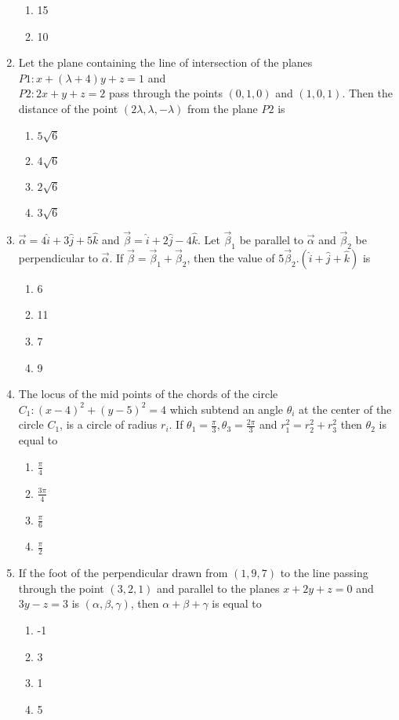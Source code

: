 \documentclass[journal]{IEEEtran}
\begin{document}
\begin{enumerate}
\begin{enumerate}
    \item 15
    \item 10
\end{enumerate}
\item Let the plane containing the line of intersection
of the planes \\
$P1: x + (\lambda + 4)y + z = 1$ and \\
$P2 : 2x + y + z = 2$ pass through the points $(0, 1, 0)$
and $(1, 0, 1)$. Then the distance of the point
$(2\lambda, \lambda, -\lambda)$ from the plane $P2$ is
\begin{enumerate}
    \item $ 5\sqrt{6}$
    \item $ 4\sqrt{6}$
    \item $ 2\sqrt{6}$
    \item $ 3\sqrt{6}$
\end{enumerate}
\item $\overrightarrow{\alpha}=4\hat{i}+3\hat{j}+5\hat{k}$ and $ \overrightarrow{\beta}=\hat{i}+2\hat{j}-4\hat{k}$. Let  $\overrightarrow{\beta}_{1}$ be parallel to $\overrightarrow{\alpha}$ and $\overrightarrow{\beta}_{2}$ be perpendicular to $\overrightarrow{\alpha}$. If $\overrightarrow{\beta}=\overrightarrow{\beta}_{1}+\overrightarrow{\beta}_{2}$, then the value of $5\overrightarrow{\beta}_{2}.(\hat{i}+\hat{j}+\hat{k})$ is
\begin{enumerate}
    \item 6
    \item 11
    \item 7
    \item 9
\end{enumerate}
\item The locus of the mid points of the chords of the
circle $C_{1}:(x-4)^{2}+(y-5)^{2}=4$ which subtend an angle $\theta_{i}$ at the center of the circle $C_{1}$, is a circle of radius $ r_{i}$. If $ \theta_{1}=\frac{\pi}{3},\theta_{3}=\frac{2\pi}{3} $ and $ r_{1}^{2}=r_{2}^{2}+r_{3}^{2}$ then $\theta_{2}$ is equal to  
\begin{enumerate}
    \item $\frac{\pi}{4}$
    \item $\frac{3\pi}{4}$
    \item $\frac{\pi}{6}$
    \item $\frac{\pi}{2}$

\end{enumerate}
\item If the foot of the perpendicular drawn from $(1, 9,
7)$ to the line passing through the point $(3, 2, 1)$ and
parallel to the planes $x + 2y + z = 0$ and $3y-z = 3$
is $(\alpha, \beta, \gamma)$, then $\alpha + \beta + \gamma$ is equal to
\begin{enumerate}
    \item -1
    \item 3
    \item 1
    \item 5
\end{enumerate}
\end{enumerate}
\end{document}
